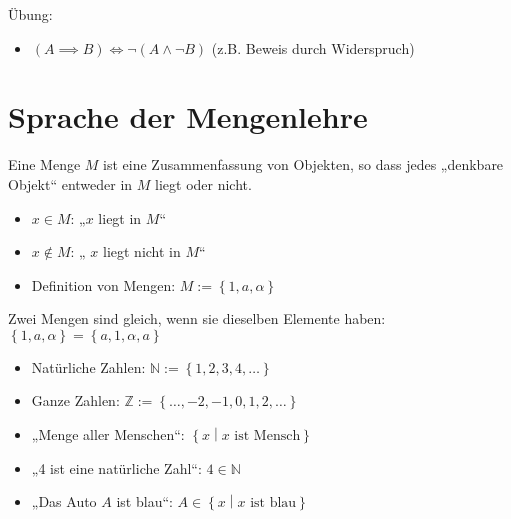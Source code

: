 Übung:
\begin{itemize}
\item $(A \implies B) \iff \neg(A \wedge \neg B)$ (z.B. Beweis durch Widerspruch)
\end{itemize}

\section{Sprache der Mengenlehre}
\begin{definition}
  Eine Menge $M$ ist eine Zusammenfassung von Objekten, so dass jedes „denkbare Objekt“ entweder in $M$ liegt oder nicht.
\end{definition}

\begin{itemize}
\item $x \in M$: „$x$ liegt in $M$“\index[sym]{$\in$}
\item $x \not\in M$: „ $x$ liegt nicht in $M$“
\item Definition von Mengen: $M := \left\{ 1, a, \alpha \right\}$
\end{itemize}

Zwei Mengen sind gleich, wenn sie dieselben Elemente haben: $\left\{ 1, a, \alpha \right\} = \left\{ a, 1, \alpha, a \right\}$

\begin{example}
  \begin{itemize}
  \item Natürliche Zahlen: $\mathbb{N} := \left\{ 1, 2, 3, 4, \dots \right\}$
  \item Ganze Zahlen: $\mathbb{Z} := \left\{ \dots, -2, -1, 0, 1, 2, \dots \right\}$
  \item „Menge aller Menschen“: $\left\{ x \middle| x \text{ ist Mensch} \right\}$
  \item „4 ist eine natürliche Zahl“: $4 \in \mathbb{N}$
  \item „Das Auto $A$ ist blau“: $A \in \left\{ x \middle| x \text{ ist blau} \right\}$
  \end{itemize}
\end{example}


